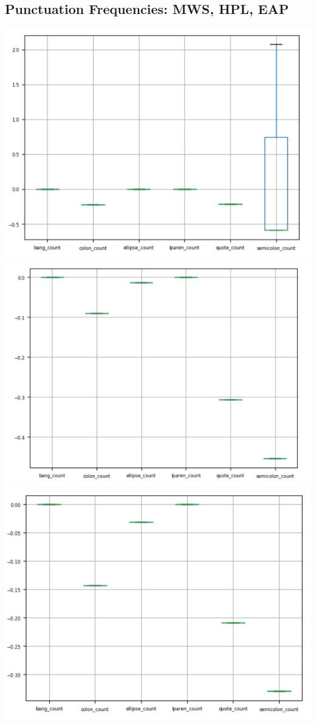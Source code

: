 \documentclass[8pt]{article}
\begin{document}
\subsection{Punctuation Frequencies: MWS, HPL, EAP}
\includegraphics[scale=.50, center]{images/punc_mws.png}
\vskip 0.2in
\includegraphics[scale=.50, center]{images/punc_hpl.png}
\vskip 0.2in
\includegraphics[scale=.50, center]{images/punc_eap.png}
\end{document}

